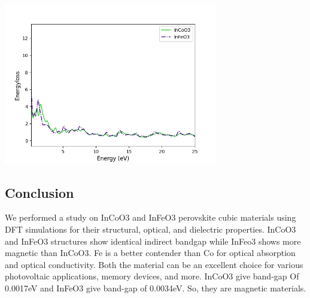 \documentclass[12pt, letterpaper]{article}
\newcommand*{\1}{\hspace{1pt}}
\begin{document}
    \begin{adjustbox}{center,caption={Energyloss spectrum of InCoO3 and InFeO3},label={somelabel},nofloat=figure,}
        \includegraphics[width=0.7\textwidth]{enloss}
    \end{adjustbox}

    \subsection*{Conclusion}
    We performed a study on  InCoO3 and InFeO3\cite{r2} perovskite cubic materials using  DFT simulations for their structural, optical, and dielectric properties. InCoO3
    and InFeO3 structures show identical indirect bandgap while InFeo3 shows more magnetic than InCoO3. Fe is a better contender than Co for optical absorption 
    and optical conductivity. Both the material can be an excellent choice for various photovoltaic applications, memory devices, and more. InCoO3 give band-gap Of
    0.0017eV and InFeO3 give band-gap of 0.0034eV. So, they are magnetic materials.
    
    
    
    
\end{document}
